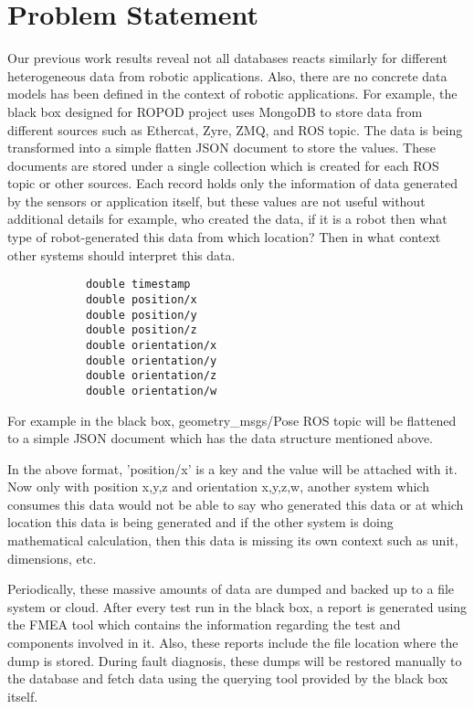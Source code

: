 

	\let\cleardoublepage\clearpage
\chapter{Problem Statement}
Our previous work results reveal not all databases reacts similarly for different heterogeneous data from robotic applications. Also, there are no concrete data models has been defined in the context of robotic applications. For example, the black box designed for ROPOD project uses MongoDB to store data from different sources such as Ethercat, Zyre, ZMQ, and ROS topic. The data is being transformed into a simple flatten JSON document to store the values. These documents are stored under a single collection which is created for each ROS topic or other sources. Each record holds only the information of data generated by the sensors or application itself, but these values are not useful without additional details for example, who created the data, if it is a robot then what type of robot-generated this data from which location? Then in what context other systems should interpret this data.

\begin{center}
	\lstset{%
		caption=geometry\_msgs/Pose ROS topic,
		basicstyle=\ttfamily\footnotesize\bfseries,
		frame=tb
	}
\begin{lstlisting}
			double timestamp
			double position/x
			double position/y
			double position/z
			double orientation/x
			double orientation/y
			double orientation/z
			double orientation/w
\end{lstlisting}
\end{center}

For example in the black box, geometry\_msgs/Pose ROS topic will be flattened to a simple JSON document which has the data structure mentioned above.

In the above format, 'position/x' is a key and the value will be attached with it. Now only with position x,y,z and orientation x,y,z,w, another system which consumes this data would not be able to say who generated this data or at which location this data is being generated and if the other system is doing mathematical calculation, then this data is missing its own context such as unit, dimensions, etc.

Periodically, these massive amounts of data are dumped and backed up to a file system or cloud. After every test run in the black box, a report is generated using the FMEA tool which contains the information regarding the test and components involved in it. Also, these reports include the file location where the dump is stored. During fault diagnosis, these dumps will be restored manually to the database and fetch data using the querying tool provided by the black box itself. 

